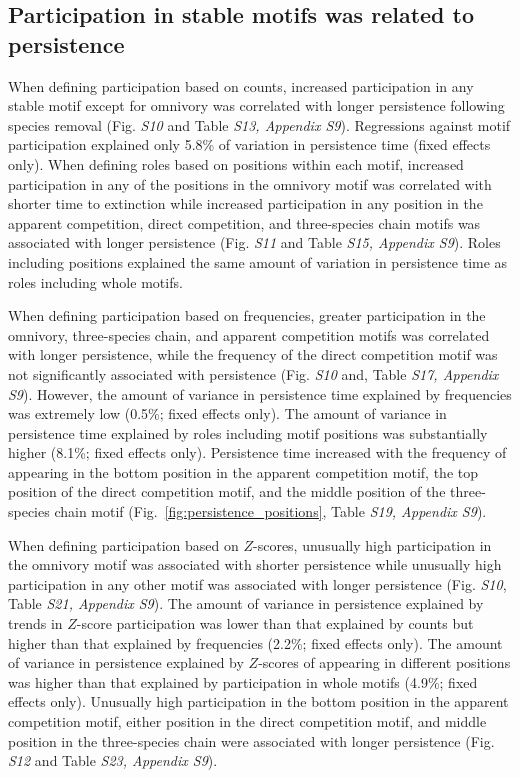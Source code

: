 \documentclass[12pt]{article}
\begin{document}
\begin{spacing}{1.0}
    \subsection*{Participation in stable motifs was related to persistence}
    
        When defining participation based on counts, increased participation in any stable motif except for omnivory was correlated with longer persistence following species removal (Fig. \emph{S10} and Table \emph{S13, Appendix S9}).
        Regressions against motif participation explained only 5.8\% of variation in persistence time (fixed effects only).
        When defining roles based on positions within each motif,  increased participation in any of the positions in the omnivory motif was correlated with shorter time to extinction while increased participation in any position in the apparent competition, direct competition, and three-species chain motifs was associated with longer persistence (Fig. \emph{S11} and  Table \emph{S15, Appendix S9}).
        Roles including positions explained the same amount of variation in persistence time as roles including whole motifs.
        
        
        When defining participation based on frequencies, greater participation in the omnivory, three-species chain, and apparent competition motifs was correlated with longer persistence, while the frequency of the direct competition motif was not significantly associated with persistence (Fig. \emph{S10} and, Table \emph{S17, Appendix S9}).
        However, the amount of variance in persistence time explained by frequencies was extremely low (0.5\%; fixed effects only). 
        The amount of variance in persistence time explained by roles including motif positions was substantially higher (8.1\%; fixed effects only).
        Persistence time increased with the frequency of appearing in the bottom position in the apparent competition motif, the top position of the direct competition motif, and the middle position of the three-species chain motif (Fig.~\ref{fig:persistence_positions}, Table \emph{S19, Appendix S9}).

        
        When defining participation based on $Z$-scores, unusually high participation in the omnivory motif was associated with shorter persistence while unusually high participation in any other motif was associated with longer persistence (Fig. \emph{S10}, Table \emph{S21, Appendix S9}).
        The amount of variance in persistence explained by trends in $Z$-score participation was lower than that explained by counts but higher than that explained by frequencies (2.2\%; fixed effects only).
        The amount of variance in persistence explained by $Z$-scores of appearing in different positions was higher than that explained by participation in whole motifs (4.9\%; fixed effects only).
        Unusually high participation in the bottom position in the apparent competition motif, either position in the direct competition motif, and middle position in the three-species chain were associated with longer persistence (Fig. \emph{S12} and Table \emph{S23, Appendix S9}).



\end{spacing}
\end{document}
